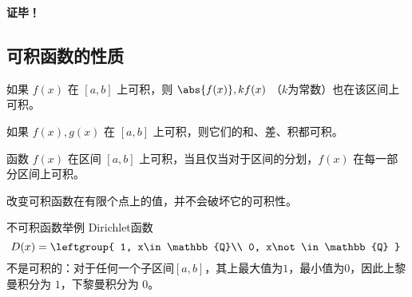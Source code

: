 \textbf{证毕！}

\subsection{可积函数的性质}

\begin{theorem}{}\label{the_InFun_2}
如果 $f(x)$ 在 $[a,b]$ 上可积，则 $\abs{f(x)},kf(x)$ （$k$为常数）也在该区间上可积。
\end{theorem}
\begin{theorem}{}
如果 $f(x),g(x)$ 在 $[a,b]$ 上可积，则它们的和、差、积都可积。
\end{theorem}

\begin{theorem}{}\label{the_InFun_1}
函数 $f(x)$ 在区间 $[a,b]$ 上可积，当且仅当对于区间的分划，$f(x)$ 在每一部分区间上可积。
\end{theorem}

\begin{theorem}{}
改变可积函数在有限个点上的值，并不会破坏它的可积性。
\end{theorem}

\begin{example}{不可积函数举例}
Dirichlet函数
\begin{equation}
D(x)=
\leftgroup{
    1, x\in\mathbb{Q}\\
    0, x\not\in\mathbb{Q}
}~
\end{equation}
不是可积的：对于任何一个子区间$[a, b]$，其上最大值为$1$，最小值为$0$，因此上黎曼积分为 $1$，下黎曼积分为 $0$。
\end{example}
